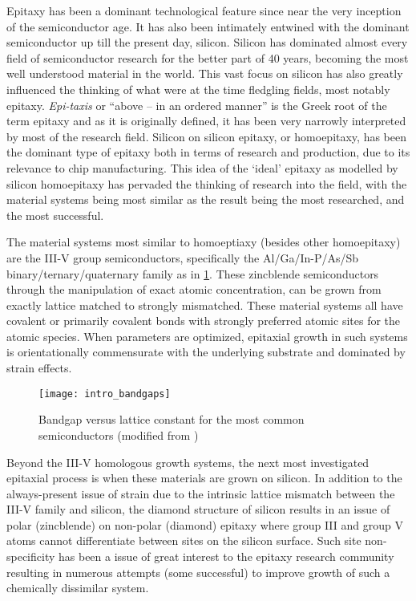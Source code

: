 Epitaxy has been a dominant technological feature since near the very inception of the semiconductor age.
It has also been intimately entwined with the dominant semiconductor up till the present day, silicon.
Silicon has dominated almost every field of semiconductor research for the better part of 40 years, becoming the most well understood material in the world.
This vast focus on silicon has also greatly influenced the thinking of what were at the time fledgling fields, most notably epitaxy.
\emph{Epi-taxis} or ``above -- in an ordered manner'' is the Greek root of the term epitaxy and as it is originally defined, it has been very narrowly interpreted by most of the research field.
Silicon on silicon epitaxy, or homoepitaxy, has been the dominant type of epitaxy both in terms of research and production, due to its relevance to chip manufacturing.
This idea of the `ideal' epitaxy as modelled by silicon homoepitaxy has pervaded the thinking of research into the field, with the material systems being most similar as the result being the most researched, and the most successful.

The material systems most similar to homoeptiaxy (besides other homoepitaxy) are the III-V group semiconductors, specifically the Al/Ga/In-P/As/Sb binary/ternary/quaternary family as in \cref{fig:intro_bandgaps}.
These zincblende semiconductors through the manipulation of exact atomic concentration, can be grown from exactly lattice matched to strongly mismatched. These material systems all have covalent or primarily covalent bonds with strongly preferred atomic sites for the atomic species.
When parameters are optimized, epitaxial growth in such systems is orientationally commensurate with the underlying substrate and dominated by strain effects.
\begin{figure}
    \centering
    \texttt{[image: intro\_bandgaps]}
    \caption[Bandgap versus lattice constant]{\label{fig:intro_bandgaps}Bandgap versus lattice constant for the most common semiconductors (modified from \cite{lattice-constant-diagram})}
\end{figure}

Beyond the III-V homologous growth systems, the next most investigated epitaxial process is when these materials are grown on silicon.
In addition to the always-present issue of strain due to the intrinsic lattice mismatch between the III-V family and silicon, the diamond structure of silicon results in an issue of polar (zincblende) on non-polar (diamond) epitaxy\cite{Kroemer1987} where group III and group V atoms cannot differentiate between sites on the silicon surface.
Such site non-specificity has been a issue of great interest to the epitaxy research community resulting in numerous attempts (some successful)\cite{Kroemer1987} to improve growth of such a chemically dissimilar system.

